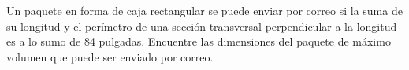 \item Un paquete en forma de caja rectangular se puede enviar por correo si la suma de su longitud y el perímetro de una sección transversal perpendicular a la longitud es a lo sumo de 84 pulgadas. Encuentre las dimensiones del paquete de máximo volumen que puede ser enviado por correo.
